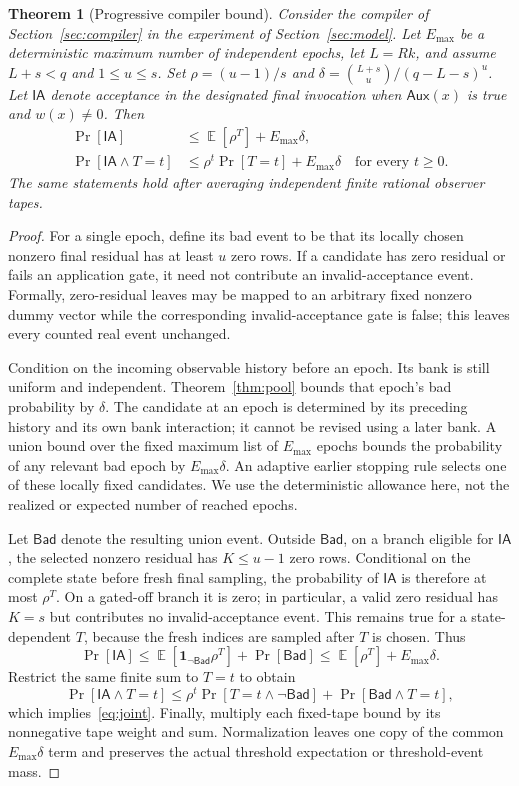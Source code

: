 \documentclass[11pt,letterpaper]{article}
\newtheorem{theorem}{Theorem}[section]
\theoremstyle{definition}
\newcommand{\Prb}{\mathop{\mathrm{Pr}}}
\newcommand{\Ex}{\mathop{\mathbb E}}
\newcommand{\Aux}{\mathsf{Aux}}
\newcommand{\Bad}{\mathsf{Bad}}
\newcommand{\Emax}{E_{\max}}
\begin{document}
\begin{theorem}[Progressive compiler bound]
\label{thm:compiler}
Consider the compiler of Section~\ref{sec:compiler} in the experiment of Section~\ref{sec:model}. Let $\Emax$ be a deterministic maximum number of independent epochs, let $L=Rk$, and assume $L+s<q$ and $1\le u\le s$. Set $\rho=(u-1)/s$ and $\delta=\binom{L+s}{u}/(q-L-s)^u$. Let $\mathsf{IA}$ denote acceptance in the designated final invocation when $\Aux(x)$ is true and $w(x)\ne0$. Then
\begin{align}
 \Prb[\mathsf{IA}]&\le \Ex[\rho^T]+\Emax\delta,\label{eq:aggregate}\\
 \Prb[\mathsf{IA}\land T=t]&\le\rho^t\Prb[T=t]+\Emax\delta
 \quad\text{for every }t\ge0.\label{eq:joint}
\end{align}
The same statements hold after averaging independent finite rational observer tapes.
\end{theorem}
\begin{proof}
For a single epoch, define its bad event to be that its locally chosen nonzero final residual has at least $u$ zero rows. If a candidate has zero residual or fails an application gate, it need not contribute an invalid-acceptance event. Formally, zero-residual leaves may be mapped to an arbitrary fixed nonzero dummy vector while the corresponding invalid-acceptance gate is false; this leaves every counted real event unchanged.

Condition on the incoming observable history before an epoch. Its bank is still uniform and independent. Theorem~\ref{thm:pool} bounds that epoch's bad probability by $\delta$. The candidate at an epoch is determined by its preceding history and its own bank interaction; it cannot be revised using a later bank. A union bound over the fixed maximum list of $\Emax$ epochs bounds the probability of any relevant bad epoch by $\Emax\delta$. An adaptive earlier stopping rule selects one of these locally fixed candidates. We use the deterministic allowance here, not the realized or expected number of reached epochs.

Let $\Bad$ denote the resulting union event. Outside $\Bad$, on a branch eligible for $\mathsf{IA}$, the selected nonzero residual has $K\le u-1$ zero rows. Conditional on the complete state before fresh final sampling, the probability of $\mathsf{IA}$ is therefore at most $\rho^T$. On a gated-off branch it is zero; in particular, a valid zero residual has $K=s$ but contributes no invalid-acceptance event. This remains true for a state-dependent $T$, because the fresh indices are sampled after $T$ is chosen. Thus
\[
 \Prb[\mathsf{IA}]
 \le\Ex[\mathbf1_{\neg\Bad}\rho^T]+\Prb[\Bad]
 \le\Ex[\rho^T]+\Emax\delta.
\]
Restrict the same finite sum to $T=t$ to obtain
\[
 \Prb[\mathsf{IA}\land T=t]
 \le\rho^t\Prb[T=t\land\neg\Bad]+\Prb[\Bad\land T=t],
\]
which implies~\eqref{eq:joint}. Finally, multiply each fixed-tape bound by its nonnegative tape weight and sum. Normalization leaves one copy of the common $\Emax\delta$ term and preserves the actual threshold expectation or threshold-event mass.
\end{proof}
\end{document}

